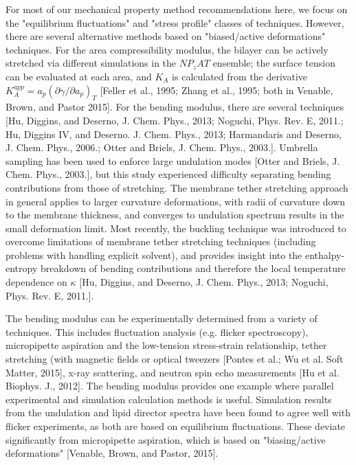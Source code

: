 \documentclass[9pt,bestpractices]{livecoms}
\begin{document}
For most of our mechanical property method recommendations here, we focus on the "equilibrium fluctuations" and "stress profile" classes of techniques.
However, there are several alternative methods based on "biased/active deformations" techniques.
For the area compressibility modulus, the bilayer can be actively stretched via different simulations in the $NP_zAT$ ensemble; the surface tension can be evaluated at each area, and $K_A$ is calculated from the derivative $K_A^{app} = a_p(\partial \gamma / \partial a_p)_T$ [Feller et al., 1995; Zhang et al., 1995; both in Venable, Brown, and Pastor 2015].
For the bending modulus, there are several techniques [Hu, Diggins, and Deserno, J. Chem. Phys., 2013; Noguchi, Phys. Rev. E, 2011.; Hu, Diggins IV, and Deserno. J. Chem. Phys., 2013; Harmandaris and Deserno, J. Chem. Phys., 2006.; Otter and Briels, J. Chem. Phys., 2003.].
Umbrella sampling has been used to enforce large undulation modes [Otter and Briels, J. Chem. Phys., 2003.], but this study experienced difficulty separating bending contributions from those of stretching.
The membrane tether stretching approach in general applies to larger curvature deformations, with radii of curvature down to the membrane thickness, and converges to undulation spectrum results in the small deformation limit.
Most recently, the buckling technique was introduced to overcome limitations of membrane tether stretching techniques (including problems with handling explicit solvent), and provides insight into the enthalpy-entropy breakdown of bending contributions and therefore the local temperature dependence on $\kappa$ [Hu, Diggins, and Deserno, J. Chem. Phys., 2013; Noguchi, Phys. Rev. E, 2011.].

The bending modulus can be experimentally determined from a variety of techniques.
This includes fluctuation analysis (e.g. flicker spectroscopy), micropipette aspiration and the low-tension stress-strain relationship, tether stretching (with magnetic fields or optical tweezers [Pontes et al.; Wu et al. Soft Matter, 2015], x-ray scattering, and neutron spin echo measurements [Hu et al. Biophys. J., 2012].
The bending modulus provides one example where parallel experimental and simulation calculation methods is useful. Simulation results from the undulation and lipid director spectra have been found to agree well with flicker experiments, as both are based on equilibrium fluctuations.
These deviate significantly from micropipette aspiration, which is based on "biasing/active deformations" [Venable, Brown, and Pastor, 2015].
\end{document}
